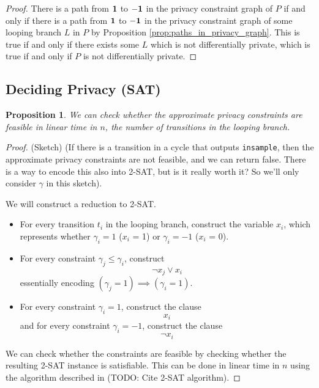 \documentclass[12pt]{article}
\newtheorem{prop}[thm]{Proposition}
\theoremstyle{definition}
\begin{document}
\begin{proof}
    There is a path from $\bf 1$ to $\bf -1$ in the privacy constraint graph of $P$ if and only if there is a path from $\bf 1$ to $\bf -1$ in the privacy constraint graph of some looping branch $L$ in $P$ by Proposition \ref{prop:paths_in_privacy_graph}. This is true if and only if there exists some $L$ which is not differentially private, which is true if and only if $P$ is not differentially private.
\end{proof}

\subsection{Deciding Privacy (SAT)}

\begin{prop}
    We can check whether the approximate privacy constraints are feasible in linear time in $n$, the number of transitions in the looping branch.
\end{prop}

\begin{proof} (Sketch)
    (If there is a transition in a cycle that outputs \texttt{insample}, then the approximate privacy constraints are not feasible, and we can return false. There is a way to encode this also into 2-SAT, but is it really worth it? So we'll only consider $\gamma$ in this sketch). 
    
    We will construct a reduction to 2-SAT.

    \begin{itemize}
        \item For every transition $t_i$ in the looping branch, construct the variable $x_i$, which represents whether $\gamma_i = 1$ ($x_i$ = 1) or $\gamma_i = -1$ ($x_i$ = 0).
        \item For every constraint $\gamma_j \leq \gamma_i$, construct 
        \begin{equation}
            \lnot x_j \lor x_i
        \end{equation}
        essentially encoding $(\gamma_j = 1) \implies (\gamma_i = 1)$.
        \item For every constraint $\gamma_i = 1$, construct the clause
        \begin{equation}
            x_i
        \end{equation}
        and for every constraint $\gamma_i = -1$, construct the clause
        \begin{equation}
            \lnot x_i
        \end{equation}
    \end{itemize}

    We can check whether the constraints are feasible by checking whether the resulting 2-SAT instance is satisfiable. This can be done in linear time in $n$ using the algorithm described in (TODO: Cite 2-SAT algorithm).
\end{proof}
\end{document}

